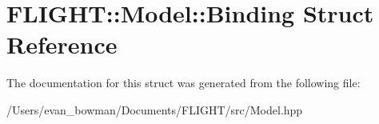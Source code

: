 \hypertarget{struct_f_l_i_g_h_t_1_1_model_1_1_binding}{}\section{F\+L\+I\+G\+HT\+:\+:Model\+:\+:Binding Struct Reference}
\label{struct_f_l_i_g_h_t_1_1_model_1_1_binding}


The documentation for this struct was generated from the following file\+:\begin{DoxyCompactItemize}
\item 
/\+Users/evan\+\_\+bowman/\+Documents/\+F\+L\+I\+G\+H\+T/src/Model.\+hpp\end{DoxyCompactItemize}
